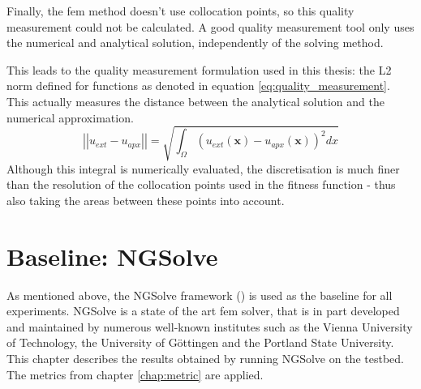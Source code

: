 \documentclass[./\jobname.tex]{subfiles}
\begin{document}
\begin{figure}[H]
	\centering
	\noindent{}
	\label{fig:aliasing error}
\end{figure}

Finally, the \gls{fem} method doesn't use collocation points, so this quality measurement could not be calculated. A good quality measurement tool only uses the numerical and analytical solution, independently of the solving method. 

This leads to the quality measurement formulation used in this thesis: the L2 norm defined for functions as denoted in equation \eqref{eq:quality_measurement}. This actually measures the distance between the analytical solution and the numerical approximation.  
\begin{equation}
\label{eq:quality_measurement}
\left|\left|u_{ext} - u_{apx}\right|\right| = \sqrt{\int_{\Omega} (u_{ext}(\mathbf{x}) - u_{apx}(\mathbf{x}))^2 dx}
\end{equation}
Although this integral is numerically evaluated, the discretisation is much finer than the resolution of the collocation points used in the fitness function - thus also taking the areas between these points into account.



\section{Baseline: NGSolve}
\label{chap:fem_baseline_results}
As mentioned above, the NGSolve framework (\cite{schoberl_ngsolvengsolve_2020}) is used as the baseline for all experiments. NGSolve is a state of the art \gls{fem} solver, that is in part developed and maintained by numerous well-known institutes such as the Vienna University of Technology, the University of Göttingen and the Portland State University. This chapter describes the results obtained by running NGSolve on the testbed. The metrics from chapter \ref{chap:metric} are applied. 
\end{document}
